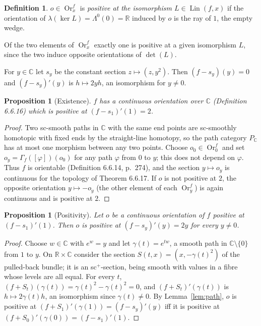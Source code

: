 \documentclass[11pt,a4paper]{article}
\theoremstyle{plain}
\newtheorem{proposition}[theorem]{Proposition}
\theoremstyle{definition}
\newtheorem{definition}[theorem]{Definition}
\theoremstyle{remark}
\newcommand{\C}{\mathbb{C}}
\newcommand{\R}{\mathbb{R}}
\newcommand{\Lin}{\operatorname{Lin}}
\newcommand{\Or}{\operatorname{Or}}
\begin{document}
\begin{definition}\label{def:positive}
$o\in\Or^f_x$ is \emph{positive at the isomorphism $L\in\Lin(f,x)$} if the orientation of
$\lambda(\ker L)=\Lambda^0(0)=\R$ induced by $o$ is the ray of $1$, the empty wedge.
\end{definition}

Of the two elements of $\Or^f_x$ exactly one is positive at a given isomorphism $L$, since the two
induce opposite orientations of $\det(L)$.

For $y\in\C$ let $s_y$ be the constant section $z\mapsto(z,y^2)$. Then $(f-s_y)(y)=0$ and
$(f-s_y)'(y)$ is $h\mapsto2yh$, an isomorphism for $y\neq0$.

\begin{proposition}[Existence]\label{prop:orexists}
$f$ has a continuous orientation over $\C$ (Definition 6.6.16) which is positive at $(f-s_1)'(1)=2$.
\end{proposition}

\begin{proof}
Two sc-smooth paths in $\C$ with the same end points are sc-smoothly homotopic with fixed ends by the
straight-line homotopy, so the path category $P_{\C}$ has at most one morphism between any two points.
Choose $o_0\in\Or^f_0$ and set $o_y=\Gamma_f([\varphi])(o_0)$ for any path $\varphi$ from $0$ to $y$; this
does not depend on $\varphi$. Thus $f$ is orientable (Definition 6.6.14, p.~274), and the section
$y\mapsto o_y$ is continuous for the topology of Theorem 6.6.17. If $o$ is not positive at $2$, the
opposite orientation $y\mapsto -o_y$ (the other element of each $\Or^f_y$) is again continuous and is
positive at $2$.
\end{proof}

\begin{proposition}[Positivity]\label{prop:orpositive}
Let $o$ be a continuous orientation of $f$ positive at $(f-s_1)'(1)$. Then $o$ is positive at
$(f-s_y)'(y)=2y$ for every $y\neq0$.
\end{proposition}

\begin{proof}
Choose $w\in\C$ with $e^w=y$ and let $\gamma(t)=e^{tw}$, a smooth path in $\C\setminus\{0\}$ from $1$ to
$y$. On $\R\times\C$ consider the section $S(t,x)=(x,-\gamma(t)^2)$ of the pulled-back bundle; it is an
sc$^+$-section, being smooth with values in a fibre whose levels are all equal. For every $t$,
$(f+S_t)(\gamma(t))=\gamma(t)^2-\gamma(t)^2=0$, and $(f+S_t)'(\gamma(t))$ is $h\mapsto2\gamma(t)h$, an
isomorphism since $\gamma(t)\neq0$. By Lemma~\ref{lem:path}, $o$ is positive at
$(f+S_1)'(\gamma(1))=(f-s_y)'(y)$ iff it is positive at $(f+S_0)'(\gamma(0))=(f-s_1)'(1)$.
\end{proof}
\end{document}
